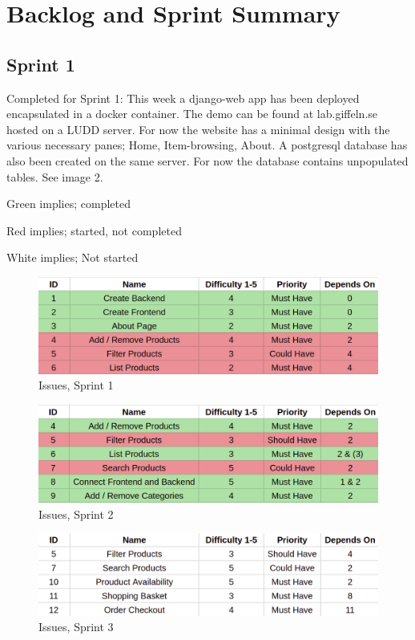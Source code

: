 \newpage

\section{Backlog and Sprint Summary}

\subsection{Sprint 1}

Completed for Sprint 1: This week a django-web app has been deployed
encapsulated in a docker container. The demo can be found at lab.giffeln.se
hosted on a LUDD server. For now the website has a minimal design with the
various necessary panes; Home, Item-browsing, About. A postgresql database
has also been created on the same server. For now the database contains
unpopulated tables. See image 2.

Green implies; completed

Red implies; started, not completed 

White implies; Not started

\begin{figure}[H]
\centering
\includegraphics[width=\textwidth]{second_sprint/sprint_1.png}
\caption{\label{fig:sprint_1} Issues, Sprint 1}
\end{figure}

\begin{figure}[H]
\centering
\includegraphics[width=\textwidth]{second_sprint/sprint_2.png}
\caption{\label{fig:sprint_2} Issues, Sprint 2}
\end{figure}

\begin{figure}[H]
\centering
\includegraphics[width=\textwidth]{second_sprint/sprint_3.png}
\caption{\label{fig:sprint_3} Issues, Sprint 3}
\end{figure}

